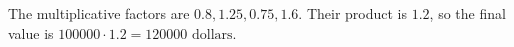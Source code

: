 The multiplicative factors are $0.8,1.25,0.75,1.6$. Their product is $1.2$, so the final value is $100000\cdot1.2=\boxed{120000\text{ dollars}}$.
